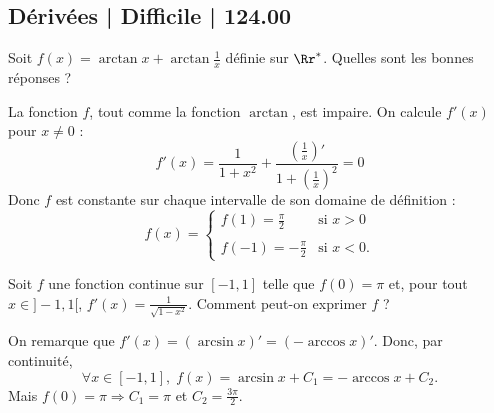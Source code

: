 \subsection{Dérivées | Difficile | 124.00}



\begin{question}

Soit $f(x)=\arctan x+\arctan \frac{1}{x}$ définie sur $\Rr^*$. Quelles sont les bonnes réponses ?
\begin{answers}  
\end{answers}
\begin{explanations}
La fonction $f$, tout comme la fonction $\arctan$, est impaire. On calcule $f'(x)$ pour $x\neq 0$ : 
$$f'(x)=\frac{1}{1+x^2}+\frac{\left(\frac{1}{x}\right)'}{1+\left(\frac{1}{x}\right)^2}=0$$
Donc $f$ est constante sur chaque intervalle de son domaine de définition :
$$f(x)=\left\{\begin{array}{ll}\displaystyle f(1)=\frac{\pi}{2}&\mbox{si }x>0\\ \\ f(-1)=-\frac{\pi}{2}&\mbox{si }x<0.\end{array}
\right.$$
\end{explanations}
\end{question}


\begin{question}

Soit $f$ une fonction continue sur $[-1,1]$ telle que $f(0)=\pi$ et, pour tout $x\in ]-1,1[$, $\displaystyle f'(x)=\frac{1}{\sqrt{1-x^2}}$. Comment peut-on exprimer $f$ ?
\begin{answers}  
\end{answers}
\begin{explanations}
On remarque que $f'(x)=(\arcsin x)'=(-\arccos x)'$. Donc, par continuité, 
$$\forall x\in [-1,1],\; f(x)=\arcsin x+C_1=-\arccos x+C_2.$$
Mais $f(0)=\pi \Rightarrow C_1=\pi$ et $\displaystyle C_2=\frac{3\pi}{2}$.
\end{explanations}
\end{question}


